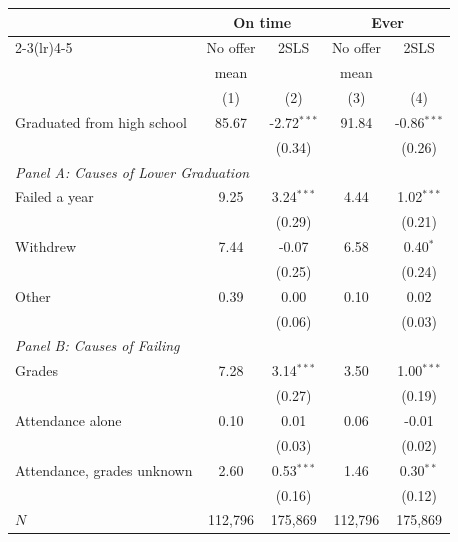 \begin{tabular}{lcccc}
\toprule
 & \multicolumn{2}{c}{On time} & \multicolumn{2}{c}{Ever}\\
\cmidrule(lr){2-3}\cmidrule(lr){4-5}
 & No offer & 2SLS & No offer & 2SLS\\
 & mean &  & mean & \\
 & (1) & (2) & (3) & (4)\\
\midrule
Graduated from high school & 85.67 & -2.72$^{***}$ & 91.84 & -0.86$^{***}$\\
 &  & (0.34) &  & (0.26)\\
\midrule
\multicolumn{5}{l}{\textit{Panel A: Causes of Lower Graduation}}\\
Failed a year & 9.25 & 3.24$^{***}$ & 4.44 & 1.02$^{***}$\\
 &  & (0.29) &  & (0.21)\\
Withdrew & 7.44 & -0.07 & 6.58 & 0.40$^{*}$\\
 &  & (0.25) &  & (0.24)\\
Other & 0.39 & 0.00 & 0.10 & 0.02\\
 &  & (0.06) &  & (0.03)\\
\midrule
\multicolumn{5}{l}{\textit{Panel B: Causes of Failing}}\\
Grades & 7.28 & 3.14$^{***}$ & 3.50 & 1.00$^{***}$\\
 &  & (0.27) &  & (0.19)\\
Attendance alone & 0.10 & 0.01 & 0.06 & -0.01\\
 &  & (0.03) &  & (0.02)\\
Attendance, grades unknown & 2.60 & 0.53$^{***}$ & 1.46 & 0.30$^{**}$\\
 &  & (0.16) &  & (0.12)\\
\midrule
$N$ & 112,796 & 175,869 & 112,796 & 175,869\\
\bottomrule
\end{tabular}

